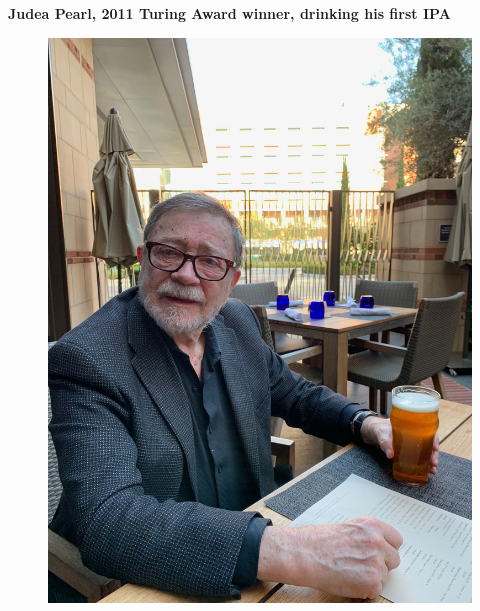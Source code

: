 \documentclass[notes=show]{beamer}
\begin{document}
\begin{frame}[plain]
\begin{center}
\textbf{Judea Pearl, 2011 Turing Award winner, drinking his first IPA}
\end{center}

\begin{figure}
\includegraphics[scale=0.05]{./lecture_includes/pearl_ipa.jpg}
\end{figure}

\end{frame}
\end{document}
